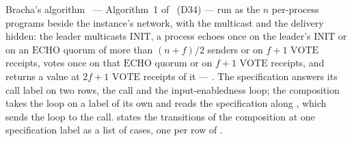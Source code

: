 \begin{definition}
  \label{def:aba-brb-impl}
  \leanok
  Bracha's algorithm~\cite{Bra87} --- Algorithm~1 of~\cite{AFW25} (D34) --- run as the $n$ per-process programs beside the instance's network, with the multicast and the delivery hidden: the leader multicasts $\mathrm{INIT}$, a process echoes once on the leader's $\mathrm{INIT}$ or on an $\mathrm{ECHO}$ quorum of more than $(n+f)/2$ senders or on $f{+}1$ $\mathrm{VOTE}$ receipts, votes once on that $\mathrm{ECHO}$ quorum or on $f{+}1$ $\mathrm{VOTE}$ receipts, and returns a value at $2f{+}1$ $\mathrm{VOTE}$ receipts of it --- .
  The specification answers its call label on two rows, the call and the input-enabledness loop; the composition takes the loop on a label of its own and reads the specification along , which sends the loop to the call.
   states the transitions of the composition at one specification label as a list of cases, one per row of .
\end{definition}
